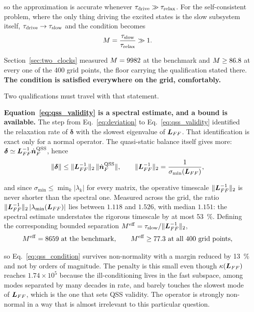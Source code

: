 \noindent so the approximation is accurate whenever $\tau_{\mathrm{drive}} \gg \tau_{\mathrm{relax}}$. For
the self-consistent problem, where the only thing driving the excited states is
the slow subsystem itself, $\tau_{\mathrm{drive}} \to \tau_{\mathrm{slow}}$ and the condition becomes
\begin{equation}
  M = \frac{\tau_{\mathrm{slow}}}{\tau_{\mathrm{relax}}} \gg 1 .
  \label{eq:qss_condition}
\end{equation}

Section~\ref{sec:two_clocks} measured $M = 9982$ at the benchmark and
$M \ge 86.8$ at every one of the 400 grid points, the floor carrying the
qualification stated there. \textbf{The condition is satisfied everywhere on
the grid, comfortably.}

Two qualifications must travel with that statement.

\textbf{Equation~\eqref{eq:qss_validity} is a spectral estimate, and a bound is
available.} The step from Eq.~\eqref{eq:deviation} to
Eq.~\eqref{eq:qss_validity} identified the relaxation rate of $\bm{\delta}$ with
the slowest eigenvalue of $\bm{L}_{FF}$. That identification is exact only for a
normal operator. The quasi-static balance itself gives more:
$\bm{\delta} \simeq \bm{L}_{FF}^{-1}\dot{\bm{n}}_F^{\rm QSS}$, hence
\begin{equation}
  \|\bm{\delta}\| \le \|\bm{L}_{FF}^{-1}\|_2\,\|\dot{\bm{n}}_F^{\rm QSS}\|,
  \qquad
  \|\bm{L}_{FF}^{-1}\|_2 = \frac{1}{\sigma_{\min}(\bm{L}_{FF})},
  \label{eq:qss_bound}
\end{equation}

\noindent and since $\sigma_{\min} \le \min_k|\lambda_k|$ for every matrix, the
operative timescale $\|\bm{L}_{FF}^{-1}\|_2$ is never shorter than the spectral
one. Measured across the grid, the ratio
$\|\bm{L}_{FF}^{-1}\|_2\,|\lambda_{\min}(\bm{L}_{FF})|$ lies between $1.118$ and
$1.526$, with median $1.151$: the spectral estimate understates the rigorous
timescale by at most \SI{53}{\percent}. Defining the corresponding bounded
separation $M^{\rm eff} = \tau_{\mathrm{slow}}/\|\bm{L}_{FF}^{-1}\|_2$,
\begin{equation}
  M^{\rm eff} = 8659 \ \text{at the benchmark},
  \qquad
  M^{\rm eff} \ge 77.3 \ \text{at all 400 grid points},
  \label{eq:M_eff}
\end{equation}

\noindent so Eq.~\eqref{eq:qss_condition} survives non-normality with a margin
reduced by \SI{13}{\percent} and not by orders of magnitude. The penalty is
this small even though $\kappa(\bm{L}_{FF})$ reaches $1.74\times10^5$ because
the ill-conditioning lives in the fast subspace, among modes
separated by many decades in rate, and barely touches the slowest mode of
$\bm{L}_{FF}$, which is the one that sets QSS validity. The operator is strongly
non-normal in a way that is almost irrelevant to this particular question.

